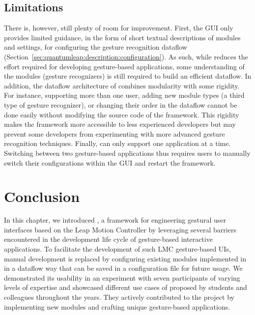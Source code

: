 \subsection{Limitations} \label{sec:quantumleap:discussion:limitations}
There is, however, still plenty of room for improvement.
%
First, the \ql GUI only provides limited guidance, in the form of short textual descriptions of modules and settings, for configuring the gesture recognition dataflow (Section~\ref{sec:quantumleap:description:configuration}). As such, while \ql reduces the effort required for developing gesture-based applications, some understanding of the modules (\eg gesture recognizers) is still required to build an efficient dataflow.
%
In addition, the dataflow architecture of \ql combines modularity with some rigidity. For instance, supporting more than one user, adding new module types (\eg a third type of gesture recognizer), or changing their order in the dataflow cannot be done easily without modifying the source code of the framework. This rigidity makes the framework more accessible to less experienced developers but may prevent some developers from experimenting with more advanced gesture recognition techniques.
%
Finally, \ql can only support one application at a time. Switching between two gesture-based applications thus requires users to manually switch their configurations within the \ql GUI and restart the framework.

\section{Conclusion} \label{sec:quantumleap:conclusion}
In this chapter, we introduced \ql, a framework for engineering gestural user interfaces based on the Leap Motion Controller by leveraging several barriers encountered in the development life cycle of gesture-based interactive applications. To facilitate the development of such LMC gesture-based UIs, manual development is replaced by configuring existing modules implemented in \ql in a dataflow way that can be saved in a configuration file for future usage.
%
We demonstrated its usability in an experiment with seven participants of varying levels of expertise and showcased different use cases of \ql proposed by students and colleagues throughout the years. They actively contributed to the project by implementing new modules and crafting unique gesture-based applications.

